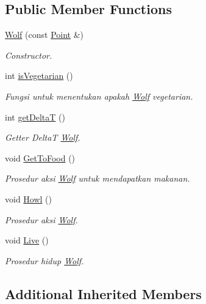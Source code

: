 \subsection*{Public Member Functions}
\begin{DoxyCompactItemize}
\item 
\hyperlink{class_wolf_adb38a4364ecc382ae56e26a2e3f9d7c2}{Wolf} (const \hyperlink{class_point}{Point} \&)
\begin{DoxyCompactList}\small\item\em Constructor. \end{DoxyCompactList}\item 
int \hyperlink{class_wolf_a59589099b9226c3b85fa9c5fb8e51836}{is\+Vegetarian} ()
\begin{DoxyCompactList}\small\item\em Fungsi untuk menentukan apakah \hyperlink{class_wolf}{Wolf} vegetarian. \end{DoxyCompactList}\item 
int \hyperlink{class_wolf_aaab51ccea5bdd26c25ad61e7cb8991a6}{get\+DeltaT} ()
\begin{DoxyCompactList}\small\item\em Getter DeltaT \hyperlink{class_wolf}{Wolf}. \end{DoxyCompactList}\item 
void \hyperlink{class_wolf_a832902ad559bbf8a73bbe16d3378ba86}{Get\+To\+Food} ()
\begin{DoxyCompactList}\small\item\em Prosedur aksi \hyperlink{class_wolf}{Wolf} untuk mendapatkan makanan. \end{DoxyCompactList}\item 
void \hyperlink{class_wolf_a88430c17fd558f2de31e77f7b0fada33}{Howl} ()
\begin{DoxyCompactList}\small\item\em Prosedur aksi \hyperlink{class_wolf}{Wolf}. \end{DoxyCompactList}\item 
void \hyperlink{class_wolf_a5902349f953664a4d53cc3ddea4b19f3}{Live} ()
\begin{DoxyCompactList}\small\item\em Prosedur hidup \hyperlink{class_wolf}{Wolf}. \end{DoxyCompactList}\end{DoxyCompactItemize}
\subsection*{Additional Inherited Members}



